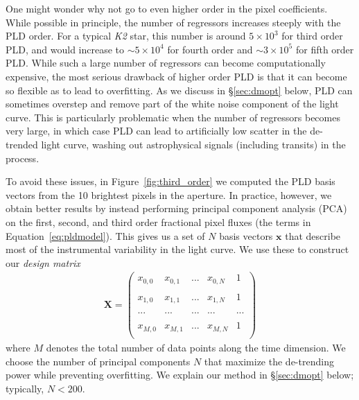 \documentclass[]{emulateapj}
\begin{document}
One might wonder why not go to even higher order in the pixel coefficients. While possible in principle,
the number of regressors increases steeply with the PLD order. For a typical \emph{K2} star, this number is
around $5\times 10^3$ for third order PLD, and would increase to $\sim5\times 10^4$ for
fourth order and $\sim3\times 10^5$ for fifth order PLD.
%
%
While such a large number of regressors can become computationally expensive, the 
most serious drawback of higher order PLD is that it can become so flexible as to
lead to overfitting. As we discuss in \S\ref{sec:dmopt} below,
PLD can sometimes overstep and remove part of the white noise component of the 
light curve. This is particularly problematic when the number of regressors becomes very large,
in which case PLD can lead to artificially low scatter in the de-trended light curve,
washing out astrophysical signals (including transits) in the process.

To avoid these issues, in Figure~\ref{fig:third_order} we computed the PLD basis vectors from
the 10 brightest pixels in the aperture. In practice, however, we obtain better results
by instead performing principal component analysis (PCA) on the first,
second, and third order fractional pixel fluxes (the terms in Equation~\ref{eq:pldmodel}).
This gives us a set of $N$ basis vectors $\mathbf{x}$ that describe most of the instrumental
variability in the light curve. We use these to construct our \emph{design matrix} 
\begin{align}
\label{eq:designmatrix}
\mathbf{X} =  \begin{pmatrix}
              x_{0,0} & x_{0,1} & ... & x_{0,N} & 1\\
              \\
              x_{1,0} & x_{1,1} & ... & x_{1,N} & 1\\
              \\
              ... & ... & ... & ... & ...\\
              \\
              x_{M,0} & x_{M,1} & ... & x_{M,N} & 1\\
              \end{pmatrix}
\end{align}
where $M$ denotes the total number of data points along the time dimension. We choose
the number of principal components $N$ that maximize the de-trending power while preventing
overfitting. We explain our method in \S\ref{sec:dmopt} below; typically, $N < 200$.
\end{document}
